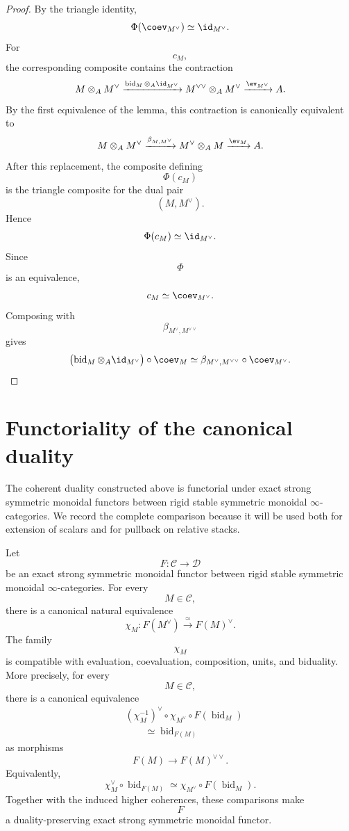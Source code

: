 \begin{proof}
By the triangle identity,
\[
    \Phi(\coev_{M^\vee})
    \simeq
    \id_{M^\vee}.
\]
For
\[
    c_M,
\]
the corresponding composite contains the contraction
\[
    M\otimes_A M^\vee
    \xrightarrow{
        \operatorname{bid}_M
        \otimes_A
        \id_{M^\vee}
    }
    M^{\vee\vee}\otimes_A M^\vee
    \xrightarrow{\ev_{M^\vee}}
    A.
\]
By the first equivalence of the lemma, this contraction is canonically
equivalent to
\[
    M\otimes_A M^\vee
    \xrightarrow{\beta_{M,M^\vee}}
    M^\vee\otimes_A M
    \xrightarrow{\ev_M}
    A.
\]
After this replacement, the composite defining
\[
    \Phi(c_M)
\]
is the triangle composite for the dual pair
\[
    (M,M^\vee).
\]
Hence
\[
    \Phi(c_M)
    \simeq
    \id_{M^\vee}.
\]
Since
\[
    \Phi
\]
is an equivalence,
\[
    c_M
    \simeq
    \coev_{M^\vee}.
\]
Composing with
\[
    \beta_{M^\vee,M^{\vee\vee}}
\]
gives
\[
    \bigl(
        \operatorname{bid}_M
        \otimes_A
        \id_{M^\vee}
    \bigr)
    \circ
    \coev_M
    \simeq
    \beta_{M^\vee,M^{\vee\vee}}
    \circ
    \coev_{M^\vee}.
\]
\end{proof}


\section{Functoriality of the canonical duality}
\label{sec:functoriality-canonical-perfect-duality}
\label{sec:base-change-perfect-duality}

The coherent duality constructed above is functorial under exact strong
symmetric monoidal functors between rigid stable symmetric monoidal
$\infty$-categories. We record the complete comparison because it will be
used both for extension of scalars and for pullback on relative stacks.

\begin{proposition}
\label{prop:duality-preserving-strong-monoidal}
Let
\[
    F
    \colon
    \mathcal C
    \longrightarrow
    \mathcal D
\]
be an exact strong symmetric monoidal functor between rigid stable
symmetric monoidal $\infty$-categories. For every
\[
    M\in\mathcal C,
\]
there is a canonical natural equivalence
\[
    \chi_M
    \colon
    F(M^\vee)
    \xrightarrow{\;\simeq\;}
    F(M)^\vee.
\]
The family
\[
    \chi_M
\]
is compatible with evaluation, coevaluation, composition, units, and
biduality. More precisely, for every
\[
    M\in\mathcal C,
\]
there is a canonical equivalence
\[
\begin{aligned}
    &
    (\chi_M^{-1})^\vee
    \circ
    \chi_{M^\vee}
    \circ
    F(\operatorname{bid}_M)
    \\
    &\qquad\simeq
    \operatorname{bid}_{F(M)}
\end{aligned}
\]
as morphisms
\[
    F(M)
    \longrightarrow
    F(M)^{\vee\vee}.
\]
Equivalently,
\[
    \chi_M^\vee
    \circ
    \operatorname{bid}_{F(M)}
    \simeq
    \chi_{M^\vee}
    \circ
    F(\operatorname{bid}_M).
\]
Together with the induced higher coherences, these comparisons make
\[
    F
\]
a duality-preserving exact strong symmetric monoidal functor.
\end{proposition}


